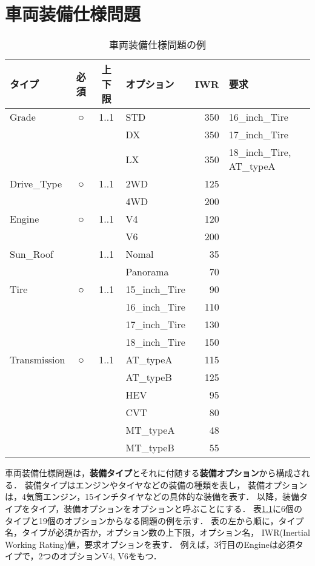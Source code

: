 \chapter{車両装備仕様問題}\label{chap:backgraound}
\begin{table}[tbp]
	\centering
	\caption{車両装備仕様問題の例}
	\label{tab:input}
	\begin{tabular}{|l|c|c|l|r|l|} \hline
	タイプ		& 必須	&上下限	& オプション 		& IWR	& 要求	\\\hline
	Grade 		& ○		& 1..1 	&STD 			& 350	& 16\_inch\_Tire	\\\cline{4-6}
				&		&		& DX 			& 350	& 17\_inch\_Tire	\\\cline{4-6}	
		 		& 		&		& LX 			& 350  	& 18\_inch\_Tire, AT\_typeA		\\\hline
	Drive\_Type 	& ○		& 1..1	& 2WD 			& 125	& 		\\\cline{4-6}
				& 		&		& 4WD 			& 200	&		\\\hline
	Engine		& ○		& 1..1 	& V4 			& 120	&		\\\cline{4-6}
				& 		&		& V6 			& 200	&		\\\hline
	Sun\_Roof 	& 		& 1..1 	& Nomal 		& 35 	& 		\\\cline{4-6}
				& 		&		& Panorama 		& 70	&		\\\hline
	Tire			& ○		& 1..1	& 15\_inch\_Tire 	& 90	&		\\\cline{4-6}
				&		&		& 16\_inch\_Tire 	& 110	&		\\\cline{4-6}
	 			& 		&		& 17\_inch\_Tire 	& 130	&		\\\cline{4-6}
	 			& 		&		& 18\_inch\_Tire 	& 150	&		\\\hline
	Transmission 	& ○ 	& 1..1	& AT\_typeA 		& 115	&		\\\cline{4-6}
			 	& 		&		& AT\_typeB 		& 125	&		\\\cline{4-6}
			 	& 		&		& HEV 			& 95	&		\\\cline{4-6}
			 	& 		&		& CVT 			& 80	&		\\\cline{4-6}
			 	& 		&		& MT\_typeA		& 48	&		\\\cline{4-6}
				& 		&		& MT\_typeB		& 55	&		\\\hline
	\end{tabular}
\end{table}

車両装備仕様問題は，\textbf{装備タイプ}とそれに付随する\textbf{装備オプション}から構成される．
装備タイプはエンジンやタイヤなどの装備の種類を表し，
装備オプションは，4気筒エンジン，15インチタイヤなどの具体的な装備を表す．
以降，装備タイプをタイプ，装備オプションをオプションと呼ぶことにする．
表\ref{tab:input}に6個のタイプと19個のオプションからなる問題の例を示す．
表の左から順に，タイプ名，タイプが必須か否か，オプション数の上下限，オプション名，
IWR(Inertial Working Rating)値，要求オプションを表す．
例えば，3行目のEngineは必須タイプで，2つのオプションV4, V6をもつ．


